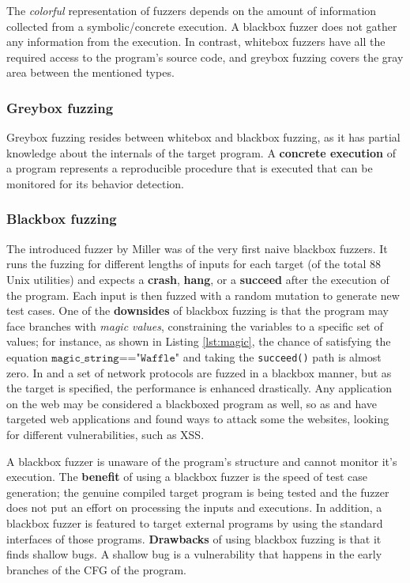 The \textit{colorful} representation of fuzzers depends on the amount of information collected from a symbolic/concrete execution. A blackbox fuzzer does not gather any information from the execution. In contrast, whitebox fuzzers have all the required access to the program's source code, and greybox fuzzing covers the gray area between the mentioned types.

\subsubsection{Greybox fuzzing}

Greybox fuzzing resides between whitebox and blackbox fuzzing, as it has partial knowledge about the internals of the target program. A \textbf{concrete execution} of a program represents a reproducible procedure that is executed that can be monitored for its behavior detection.

\subsubsection{Blackbox fuzzing}

The introduced fuzzer by Miller \cite{miller1990empirical} was of the very first naive blackbox fuzzers. It runs the fuzzing for different lengths of inputs for each target (of the total 88 Unix utilities) and expects a \textbf{crash}, \textbf{hang}, or a \textbf{succeed} after the execution of the program. Each input is then fuzzed with a random mutation to generate new test cases. One of the \textbf{downsides} of blackbox fuzzing is that the program may face branches with \textit{magic values}, constraining the variables to a specific set of values; for instance, as shown in Listing \ref{lst:magic}, the chance of satisfying the equation $\texttt{magic\_string=="Waffle"}$ and taking the \texttt{succeed()} path is almost zero. In \cite{banks2006snooze} and \cite{gascon2015pulsar} a set of network protocols are fuzzed in a blackbox manner, but as the target is specified, the performance is enhanced drastically. Any application on the web may be considered a blackboxed program as well, so as \cite{doupe2012enemy} and \cite{duchene2012xss} have targeted web applications and found ways to attack some the websites, looking for different vulnerabilities, such as XSS.

A blackbox fuzzer is unaware of the program's structure and cannot monitor it's execution. The \textbf{benefit} of using a blackbox fuzzer is the speed of test case generation; the genuine compiled target program is being tested and the fuzzer does not put an effort on processing the inputs and executions. In addition, a blackbox fuzzer is featured to target external programs by using the standard interfaces of those programs. \textbf{Drawbacks} of using blackbox fuzzing is that it finds shallow bugs. A shallow bug is a vulnerability that happens in the early branches of the CFG of the program.

